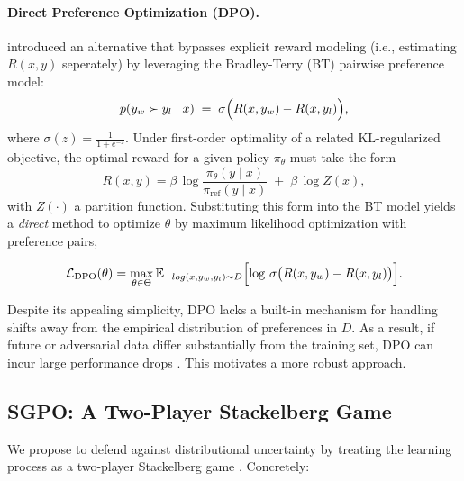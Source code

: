 \paragraph{Direct Preference Optimization (DPO).}
\citet{Rafailov2023Direct} introduced an alternative that bypasses explicit reward modeling (i.e., estimating $R(x,y)$ seperately) by leveraging the Bradley-Terry (BT) pairwise preference model:
$$
p(y_w \succ y_l \mid x)
\;=\;
\sigma\Bigl(R(x, y_w) - R(x, y_l)\Bigr),
$$
where $\sigma(z) = \frac{1}{1 + e^{-z}}$. Under first-order optimality of a related KL-regularized objective, the optimal reward for a given policy $\pi_\theta$ must take the form
\begin{equation}
\label{eq:optimal_reward_supp}
R(x,y)
=
\beta \,\log \frac{\pi_\theta(y \mid x)}{\pi_{\mathrm{ref}}(y \mid x)} \;+\;\beta \,\log Z(x),
\end{equation}
with $Z(\cdot)$ a partition function. Substituting this form into the BT model yields a \emph{direct} method to optimize $\theta$ by maximum likelihood optimization with preference pairs,
\begin{small}
\begin{equation}
\label{eq:dpo_loss_supp}
\mathcal{L}_{\mathrm{DPO}}(\theta)
=\max_{\theta \in \Theta}
\mathbb{E}_{-log(x,y_w,y_l) \sim D}
\Bigl[
  \log\,
  \sigma\bigl(R(x,y_w)-R(x,y_l)\bigr)
\Bigr].
\end{equation}
\end{small}
\noindent
Despite its appealing simplicity, DPO lacks a built-in mechanism for handling shifts away from the empirical distribution of preferences in $D$.  As a result, if future or adversarial data differ substantially from the training set, DPO can incur large performance drops \citep{Chowdhury2024Provably}. This motivates a more robust approach.


\subsection{SGPO: A Two-Player Stackelberg Game}
\label{sec:sgpo_formulation}

We propose to defend against distributional uncertainty by treating the learning process as a two-player Stackelberg game \citep{Bacsar1998Dynamic}.  Concretely:

